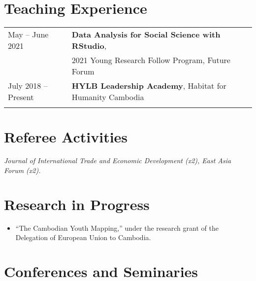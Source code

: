 \documentclass[10pt,a4paper]{article}
\begin{document}
\section*{Teaching Experience}
	\vspace{-0em}
	\noindent 
	\begin{tabular}{@{} l l}
		
		\hspace{1em} May -- June 2021 & \textbf{Data Analysis for Social Science with RStudio}, \\
		& 2021 Young Research Follow Program, Future Forum \\
			
		\hspace{1em} July 2018 -- Present    & \textbf{HYLB Leadership Academy}, Habitat for Humanity Cambodia \\
		& \\
		
	\end{tabular} 
	\vspace{-1em}	
\section*{Referee Activities}
\textit{Journal of International Trade and Economic Development (x2), East Asia Forum (x2).
}
\vspace{-1.em}
					
\section*{Research in Progress}
		\vspace{-0.5em}
		\begin{adjustwidth}{.7cm}{}
			\begin{itemize}[label={},itemindent=-2em,leftmargin=2em]
			
			\item “The Cambodian Youth Mapping,'' under the research grant of the Delegation of European Union to Cambodia.
			\end{itemize}
		\end{adjustwidth}
		\vspace{-1em}
\section*{Conferences and Seminaries}
\vspace{-0.5em}
\end{document}
